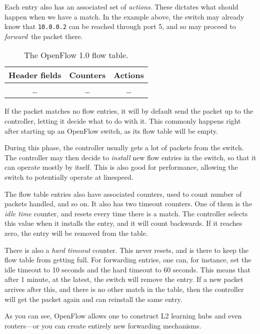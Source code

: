 Each entry also has an associated set of \textit{actions}.  These dictates
what should happen when we have a match.  In the example above, the switch
may already know that \texttt{10.0.0.2} can be reached through port 5, and
so may proceed to \textit{forward} the packet there.

\begin{table}[H]
  \centering
  \begin{tabular}{|c|c|c|}
    \hline \textbf{Header fields} &
           \textbf{Counters} &
           \textbf{Actions} \\
    \hline \dots & \dots & \dots \\
  \end{tabular}

  \caption{The OpenFlow 1.0 flow table.}
  \label{openflow.flow.entry.spec}
\end{table}

If the packet matches no flow entries, it will by default send the packet up
to the controller, letting it decide what to do with it.  This commonly
happens right after starting up an OpenFlow switch, as its flow table will
be empty.

During this phase, the controller usually gets a lot of packets from the
switch.  The controller may then decide to \textit{install} new flow entries
in the switch, so that it can operate mostly by itself.  This is also good
for performance, allowing the switch to potentially operate at linespeed.

The flow table entries also have associated counters, used to count number
of packets handled, and so on.  It also has two timeout counters.  One of
them is the \textit{idle time} counter, and resets every time there is a
match.  The controller selects this value when it installs the entry, and it
will count backwards.  If it reaches zero, the entry will be removed from
the table.

There is also a \textit{hard timeout} counter.  This never resets, and is
there to keep the flow table from getting full.  For forwarding entries, one
can, for instance, set the idle timeout to 10 seconds and the hard timeout
to 60 seconds.  This means that after 1 minute, at the latest, the switch
will remove the entry.  If a new packet arrives after this, and there is no
other match in the table, then the controller will get the packet again and
can reinstall the same entry.

As you can see, OpenFlow allows one to construct L2 learning hubs and even
routers---or you can create entirely new forwarding mechanisms.

